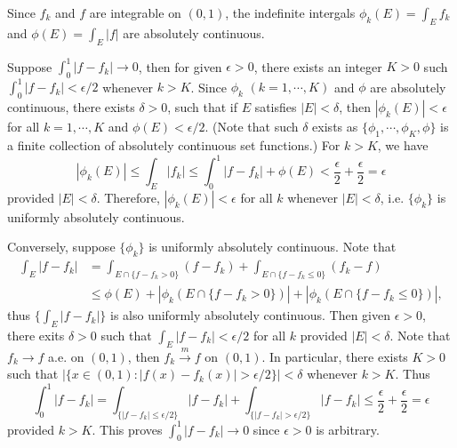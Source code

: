 \begin{exercise}{7.17}
	Since $f_k$ and $f$ are integrable on $(0,1)$, the indefinite intergals $\phi_k(E)=\int_Ef_k$ and $\phi(E)=\int_E|f|$ are absolutely continuous.
	
	Suppose $\int_0^1|f-f_k|\to0$, then for given $\epsilon>0$, there exists an integer $K>0$ such $\int_0^1|f-f_k|<\epsilon/2$ whenever $k>K$. Since
 $\phi_k$ $(k=1,\cdots,K)$ and $\phi$ are absolutely continuous, there exists $\delta>0$, such that if $E$ satisfies $|E|<\delta$, then $|\phi_k(E)|<\epsilon$ for all $k=1,\cdots,K$ and
 $\phi(E)<\epsilon/2$. (Note that such $\delta$ exists as $\{\phi_1,\cdots,\phi_K,\phi\}$ is a finite collection of absolutely continuous set functions.) For $k>K$, we have
 $$|\phi_k(E)|\leq\int_E|f_k|\leq\int_0^1|f-f_k|+\phi(E)<\frac{\epsilon}{2}+\frac{\epsilon}{2}=\epsilon$$
 provided $|E|<\delta$. Therefore, $|\phi_k(E)|<\epsilon$ for all $k$ whenever $|E|<\delta$, i.e. $\{\phi_k\}$ is uniformly absolutely continuous.
 
 Conversely, suppose $\{\phi_k\}$ is uniformly absolutely continuous. Note that 
 \begin{equation*}
 	\begin{aligned}
 \int_E|f-f_k|&=\int_{E\cap\{f-f_k>0\}}(f-f_k)+\int_{{E}\cap\{f-f_k\leq0\}}(f_k-f)\\&\leq\phi(E)+|\phi_k(E\cap\{f-f_k>0\})|+|\phi_k(E\cap\{f-f_k\leq0\})|,
 	\end{aligned}
 \end{equation*}
 thus $\{\int_E|f-f_k|\}$ is also uniformly absolutely continuous. 
  Then given $\epsilon>0$, there exits $\delta>0$ such that $\int_E|f-f_k|<\epsilon/2$ for all $k$ provided $|E|<\delta$. Note that $f_k\to f$ a.e. on $(0,1)$, then $f_k\overset{m}{\longrightarrow} f$ on $(0,1)$. In particular, there exists $K>0$ such that $|\{x\in(0,1):|f(x)-f_k(x)|>\epsilon/2\}|<\delta$ whenever $k>K$. Thus 
 \begin{equation*}
 	\int_0^1|f-f_k|=\int_{\{|f-f_k|\leq\epsilon/2\}}|f-f_k|+\int_{\{|f-f_k|>\epsilon/2\}}|f-f_k|
 	\leq\frac{\epsilon}{2}+\frac{\epsilon}{2}=\epsilon
 \end{equation*}
 provided $k>K$.
 This proves $\int_0^1|f-f_k|\to 0$ since $\epsilon>0$ is arbitrary.
\end{exercise}